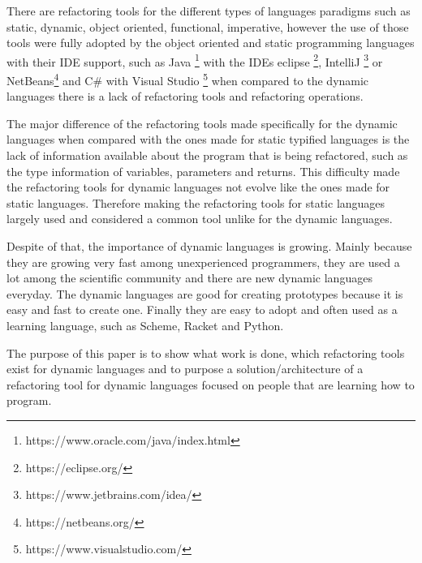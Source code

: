 There are refactoring tools for the different types of languages paradigms such as static, dynamic, object oriented, functional, imperative, however the use of those tools were fully adopted by the object oriented and static programming languages with their IDE support, such as Java \footnote{https://www.oracle.com/java/index.html} with the IDEs eclipse \footnote{https://eclipse.org/}, IntelliJ \footnote{https://www.jetbrains.com/idea/} or NetBeans\footnote{https://netbeans.org/} and C\# with Visual Studio \footnote{https://www.visualstudio.com/} when %
compared to the dynamic languages there is a lack of refactoring tools and refactoring operations.

The major difference of the refactoring tools made specifically for the dynamic languages when compared with the ones made for static typified languages is the lack of information available about the program that is being refactored, such as the type information of variables, parameters and returns. 
This difficulty made the refactoring tools for dynamic languages not evolve like the ones made for static languages. 
Therefore making the refactoring tools for static languages largely used and considered a common tool unlike for the dynamic languages.  %

Despite of that, the importance of dynamic languages is growing. Mainly because they are growing very fast among unexperienced programmers, they are used a lot among the scientific community and there are new dynamic languages everyday. 
The dynamic languages are good for creating prototypes because it is easy and fast to create one. Finally they are easy to adopt and often used as a learning language, such as Scheme, Racket and Python. %


The purpose of this paper is to show what work is done, which refactoring tools exist for dynamic languages and to purpose a solution/architecture of a refactoring tool for dynamic languages focused on people that are learning how to program. %







